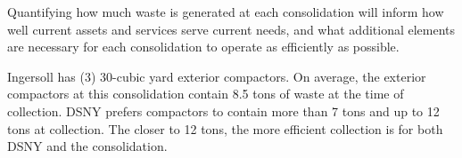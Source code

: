 
    Quantifying how much waste is generated at each consolidation will inform how well current assets and services serve current needs, and what additional elements are necessary for each consolidation to operate as efficiently as possible.
    
    Ingersoll has (3) 30-cubic yard exterior compactors. On average, the exterior compactors at this consolidation contain 8.5 tons of waste at the time of collection. DSNY prefers compactors to contain more than 7 tons and up to 12 tons at collection. The closer to 12 tons, the more efficient collection is for both DSNY and the consolidation.